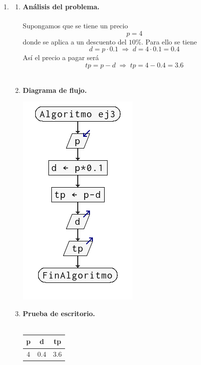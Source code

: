 \begin{enumerate}
\begin{enumerate}[\bfseries a)]
\end{enumerate}

\newpage


\item 
\begin{enumerate}[\bfseries a)]
    
    \item \textbf{Análisis del problema.}\\\\
    Supongamos que se tiene un precio $$p=4$$ donde se aplica a un descuento del $10\%$. Para ello se tiene $$d=p\cdot 0.1 \; \Longrightarrow \; d = 4\cdot 0.1 = 0.4$$
    Así el precio a pagar será $$tp = p-d \; \Longrightarrow \; tp = 4-0.4 = 3.6$$\\

    \item \textbf{Diagrama de flujo.}\\
	\begin{center}
	    \includegraphics[scale=.9]{imagenes/tarea2/ej3df.png}
	\end{center}
	\vspace{1cm}

    \item \textbf{Prueba de escritorio.}\\\\
	\begin{center}
	    \begin{tabular}{c|c|c}
		p&d&tp\\
		\hline
		4&0.4&3.6\\
	    \end{tabular}
	\end{center}
	\vspace{2cm}
    

\end{enumerate}
\end{enumerate}
